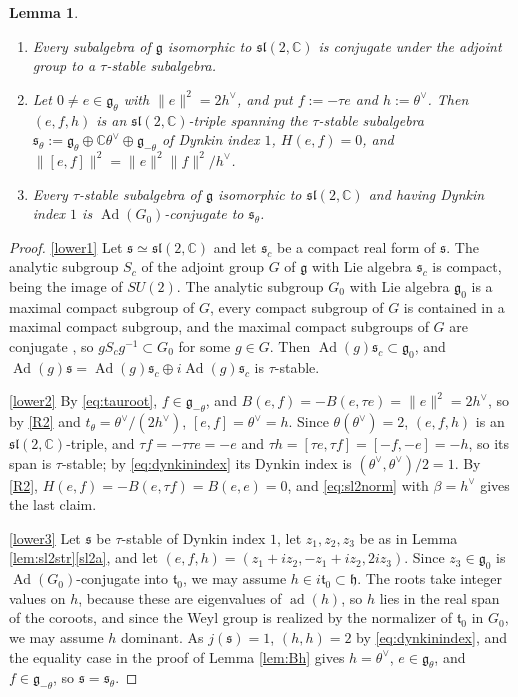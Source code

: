 \documentclass[leqno,10pt]{amsart}
\newtheorem{lemma}[theorem]{Lemma}%
\theoremstyle{definition}
\numberwithin{equation}{section}
\newcommand{\h}{\mathfrak{h}}
\newcommand{\sll}{\mathfrak{sl}}
\newcommand{\g}{\mathfrak{g}}
\newcommand{\ad}{\operatorname{ad}}
\newcommand{\Ad}{\operatorname{Ad}}
\newcommand{\com}{\mathbb C}
\newcommand{\gz}{\g_{0}}
\newcommand{\hv}{h^\vee}
\newcommand{\norm}[1]{\lVert #1\rVert}
\newcommand{\subs}{\mathfrak{s}}
\begin{document}
\begin{lemma}\label{lem:lower}
\leavevmode\noindent
\begin{enumerate}[label=(\arabic*), ref=(\arabic*)]
\item\label{lower1} Every subalgebra of $\g$ isomorphic to $\sll(2, \com)$ is conjugate under the adjoint group to a $\tau$-stable subalgebra.
\item\label{lower2} Let $0 \neq e \in \g_{\theta}$ with $\norm{e}^{2} = 2\hv$, and put $f := -\tau e$ and $h := \theta^{\vee}$. Then $(e, f, h)$ is an $\sll(2, \com)$-triple spanning the $\tau$-stable subalgebra $\subs_{\theta} := \g_{\theta} \oplus \com\theta^{\vee} \oplus \g_{-\theta}$ of Dynkin index $1$, $H(e, f) = 0$, and $\norm{[e, f]}^{2} = \norm{e}^{2}\norm{f}^{2}/\hv$.
\item\label{lower3} Every $\tau$-stable subalgebra of $\g$ isomorphic to $\sll(2, \com)$ and having Dynkin index $1$ is $\Ad(G_{0})$-conjugate to $\subs_{\theta}$.
\end{enumerate}
\end{lemma}
\begin{proof}
\ref{lower1} Let $\subs \simeq \sll(2, \com)$ and let $\subs_{c}$ be a compact real form of $\subs$. The analytic subgroup $S_{c}$ of the adjoint group $G$ of $\g$ with Lie algebra $\subs_{c}$ is compact, being the image of $SU(2)$. The analytic subgroup $G_{0}$ with Lie algebra $\gz$ is a maximal compact subgroup of $G$, every compact subgroup of $G$ is contained in a maximal compact subgroup, and the maximal compact subgroups of $G$ are conjugate \cite[Chapter VI]{Helgason}, so $gS_{c}g^{-1} \subset G_{0}$ for some $g \in G$. Then $\Ad(g)\subs_{c} \subset \gz$, and $\Ad(g)\subs = \Ad(g)\subs_{c} \oplus i\Ad(g)\subs_{c}$ is $\tau$-stable.

\ref{lower2} By \eqref{eq:tauroot}, $f \in \g_{-\theta}$, and $B(e, f) = -B(e, \tau e) = \norm{e}^{2} = 2\hv$, so by \ref{R2} and $t_{\theta} = \theta^{\vee}/(2\hv)$, $[e, f] = \theta^{\vee} = h$. Since $\theta(\theta^{\vee}) = 2$, $(e, f, h)$ is an $\sll(2, \com)$-triple, and $\tau f = -\tau\tau e = -e$ and $\tau h = [\tau e, \tau f] = [-f, -e] = -h$, so its span is $\tau$-stable; by \eqref{eq:dynkinindex} its Dynkin index is $(\theta^{\vee}, \theta^{\vee})/2 = 1$. By \ref{R2}, $H(e, f) = -B(e, \tau f) = B(e, e) = 0$, and \eqref{eq:sl2norm} with $\beta = \hv$ gives the last claim.

\ref{lower3} Let $\subs$ be $\tau$-stable of Dynkin index $1$, let $z_{1}, z_{2}, z_{3}$ be as in Lemma \ref{lem:sl2str}\ref{sl2a}, and let $(e, f, h) = (z_{1} + iz_{2}, -z_{1} + iz_{2}, 2iz_{3})$. Since $z_{3} \in \gz$ is $\Ad(G_{0})$-conjugate into $\mathfrak{t}_{0}$, we may assume $h \in i\mathfrak{t}_{0} \subset \h$. The roots take integer values on $h$, because these are eigenvalues of $\ad(h)$, so $h$ lies in the real span of the coroots, and since the Weyl group is realized by the normalizer of $\mathfrak{t}_{0}$ in $G_{0}$, we may assume $h$ dominant. As $j(\subs) = 1$, $(h, h) = 2$ by \eqref{eq:dynkinindex}, and the equality case in the proof of Lemma \ref{lem:Bh} gives $h = \theta^{\vee}$, $e \in \g_{\theta}$, and $f \in \g_{-\theta}$, so $\subs = \subs_{\theta}$.
\end{proof}
\end{document}
